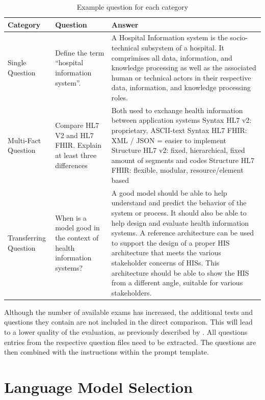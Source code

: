 \begin{table}
\begin{tabularx}{\textwidth}{p{2.5cm}p{3cm}X}
\toprule
\textbf{Category} & \textbf{Question} & \textbf{Answer} \\
\midrule
Single Question & Define the term \enquote{hospital information system}. & A Hospital Information system is the socio-technical subsystem of a hospital. It comprimises all data, information, and knowledge processing as well as the associated human or technical actors in their respective data, information, and knowledge processing roles. \\
Multi-Fact Question & Compare HL7 V2 and HL7 FHIR. Explain at least three differences & Both used to exchange health information between application systems\newline
Syntax HL7 v2: proprietary, ASCII-text\newline
Syntax HL7 FHIR: XML / JSON = easier to implement\newline
Structure HL7 v2: fixed, hierarchical, fixed amount of segments and codes\newline
Structure HL7 FHIR: flexible, modular, resource/element based \\
Transferring Question & When is a model good in the context of health information systems? & A good model should be able to help understand and predict the behavior of the system or process. It should also be able to help design and evaluate health information systems. A reference architecture can be used to support the design of a proper HIS architecture that meets the various stakeholder concerns of HISs. This architecture should be able to show the HIS from a different angle, suitable for various stakeholders. \\
\bottomrule
\end{tabularx}
\caption[Example question for each of the three categories]{Example question for each category}\label{tab:question_categories}
\end{table}
%
Although the number of available exams has increased, the additional tests and questions they contain are not included in the direct comparison.
This will lead to a lower quality of the evaluation, as previously described by \citet{Paul_Keller}.
%
All questions entries from the respective question files need to be extracted.
The questions are then combined with the instructions within the prompt template.
%
\section{Language Model Selection}\label{sec:model_selection}

